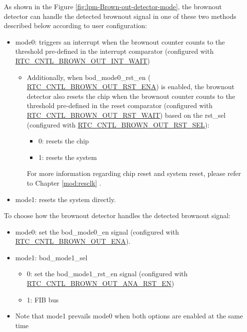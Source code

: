 \documentclass[main\_\_EN.tex]{subfiles}
\begin{document}
As shown in the Figure \ref{fig:lpm-Brown-out-detector-mode}, the brownout detector can handle the detected brownout signal in one of these two methods described below according to user configuration:

\begin{itemize}
    \item mode0: triggers an interrupt when the brownout counter counts to the threshold pre-defined in the interrupt comparator (configured with \hyperref[fielddesc:RTCCNTLBROWNOUTENA]{RTC\_CNTL\_BROWN\_OUT\_INT\_WAIT})
    \begin{itemize}
        \item Additionally, when bod\_mode0\_rst\_en ( \hyperref[fielddesc:RTCCNTLBROWNOUTRSTENA]{RTC\_CNTL\_BROWN\_OUT\_RST\_ENA}) is enabled, the brownout detector also resets the chip when the brownout counter counts to the threshold pre-defined in the reset comparator (configured with \hyperref[fielddesc:RTCCNTLBROWNOUTENA]{RTC\_CNTL\_BROWN\_OUT\_RST\_WAIT}) based on the rst\_sel (configured with \hyperref[fielddesc:RTCCNTLBROWNOUTRSTSEL]{RTC\_CNTL\_BROWN\_OUT\_RST\_SEL}):
        \begin{itemize}
            \item 0: resets the chip
            \item 1: resets the system
        \end{itemize}
        For more information regarding chip reset and system reset, please refer to Chapter \ref{mod:resclk} \textit{}.
    \end{itemize}
    \item mode1: resets the system directly.
    \end{itemize}

To choose how the brownout detector handles the detected brownout signal:
\begin{itemize}
    \item mode0: set the bod\_mode0\_en signal (configured with \hyperref[fielddesc:RTCCNTLBROWNOUTENA]{RTC\_CNTL\_BROWN\_OUT\_ENA}).
    \item mode1: bod\_mode1\_sel
    \begin{itemize}
        \item 0: set the bod\_mode1\_rst\_en signal (configured with \hyperref[fielddesc:RTCCNTLBROWNOUTANARSTEN]{RTC\_CNTL\_BROWN\_OUT\_ANA\_RST\_EN})
        \item 1: FIB bus
    \end{itemize}
    \item Note that mode1 prevails mode0 when both options are enabled at the same time
\end{itemize}
\end{document}
